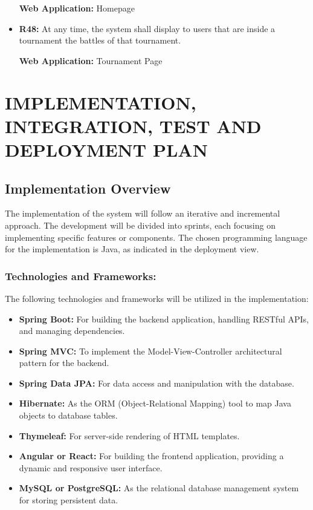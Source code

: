 \documentclass{article}
\begin{document}
\begin{itemize}
    \textbf{Web Application:} Homepage

    \item \textbf{R48:} At any time, the system shall display to users that are inside a tournament the battles of that tournament.
    
    \textbf{Web Application:} Tournament Page


\end{itemize}

\newpage

\section{IMPLEMENTATION, INTEGRATION, TEST AND DEPLOYMENT PLAN}

\subsection{Implementation Overview}

The implementation of the system will follow an iterative and incremental approach. The development will be divided into sprints, each focusing on implementing specific features or components. The chosen programming language for the implementation is Java, as indicated in the deployment view.

\subsubsection*{Technologies and Frameworks:}
The following technologies and frameworks will be utilized in the implementation:

\begin{itemize}
    \item \textbf{Spring Boot:} For building the backend application, handling RESTful APIs, and managing dependencies.
    \item \textbf{Spring MVC:} To implement the Model-View-Controller architectural pattern for the backend.
    \item \textbf{Spring Data JPA:} For data access and manipulation with the database.
    \item \textbf{Hibernate:} As the ORM (Object-Relational Mapping) tool to map Java objects to database tables.
    \item \textbf{Thymeleaf:} For server-side rendering of HTML templates.
    \item \textbf{Angular or React:} For building the frontend application, providing a dynamic and responsive user interface.
    \item \textbf{MySQL or PostgreSQL:} As the relational database management system for storing persistent data.
\end{itemize}
\end{document}
